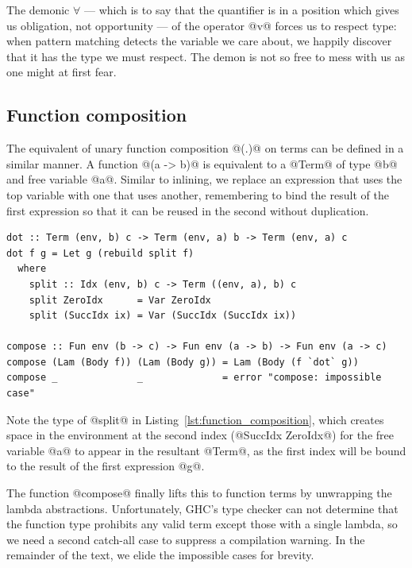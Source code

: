 The demonic $\forall$ --- which is to say that the quantifier is in a position
which gives us obligation, not opportunity --- of the operator @v@ forces
us to respect type: when pattern matching detects the variable we care about,
we happily discover that it has the type we must respect. The demon is not so
free to mess with us as one might at first fear.


\subsection{Function composition}
\label{sec:function_composition}

The equivalent of unary function composition @(.)@ on terms can be
defined in a similar manner. A function @(a -> b)@ is equivalent to a
@Term@ of type @b@ and free variable @a@. Similar to inlining, we
replace an expression that uses the top variable with one that uses another,
remembering to bind the result of the first expression so that it can be reused
in the second without duplication.

\begin{lstlisting}[style=haskell_float
    ,label=lst:function_composition
    ,caption={A simultaneous substitution to compose unary function terms}]
dot :: Term (env, b) c -> Term (env, a) b -> Term (env, a) c
dot f g = Let g (rebuild split f)
  where
    split :: Idx (env, b) c -> Term ((env, a), b) c
    split ZeroIdx      = Var ZeroIdx
    split (SuccIdx ix) = Var (SuccIdx (SuccIdx ix))

compose :: Fun env (b -> c) -> Fun env (a -> b) -> Fun env (a -> c)
compose (Lam (Body f)) (Lam (Body g)) = Lam (Body (f `dot` g))
compose _              _              = error "compose: impossible case"
\end{lstlisting}

Note the type of @split@ in Listing~\ref{lst:function_composition}, which
creates space in the environment at the second index (@SuccIdx ZeroIdx@) for the
free variable @a@ to appear in the resultant @Term@, as the first index will be
bound to the result of the first expression @g@.

The function @compose@ finally lifts this to function terms by unwrapping the
lambda abstractions. Unfortunately, GHC's type checker can not determine that the
function type prohibits any valid term except those with a single lambda, so we
need a second catch-all case to suppress a compilation warning. In the remainder
of the text, we elide the impossible cases for brevity.


